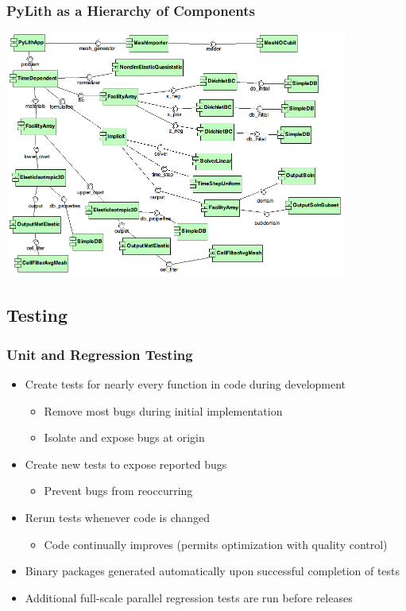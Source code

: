 \documentclass{beamer}
\begin{document}
\begin{frame}
  \frametitle{PyLith as a Hierarchy of Components}
  \includegraphics[height=3.2in]{figs/step01_components}
\end{frame}



\subsection{Testing}

\begin{frame}
  \frametitle{Unit and Regression Testing}

  \begin{itemize}
  \item Create tests for nearly every function in code during development
    \begin{itemize}
    \item Remove most bugs during initial implementation
    \item Isolate and expose bugs at origin
    \end{itemize}
  \item Create new tests to expose reported bugs
    \begin{itemize}
    \item Prevent bugs from reoccurring
    \end{itemize}
  \item Rerun tests whenever code is changed
    \begin{itemize}
    \item Code continually improves (permits optimization with
      quality control)
    \end{itemize}
  \item Binary packages generated automatically upon successful
    completion of tests
  \item Additional full-scale parallel regression tests are run before releases
  \end{itemize}

\end{frame}
\end{document}
